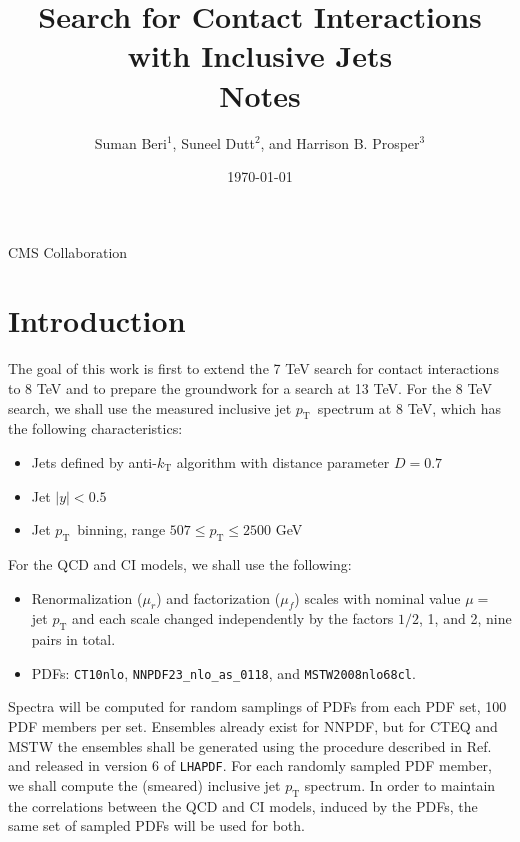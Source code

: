 \documentclass[aps,prd,preprint,nofootinbib]{revtex4}
\begin{document}
\newcommand{\pT}{\textrm{$p_\textrm{T}$}}
\newcommand{\pTprime}{\textrm{$p_\textrm{T}^\prime$}}


\title{Search for Contact Interactions with Inclusive Jets\\Notes}

\author{Suman Beri$^1$, Suneel Dutt$^2$, and Harrison B. Prosper$^3$}



\date{\today}

\maketitle

\centerline{\large{CMS Collaboration}}

\section{Introduction}
The goal of this work is first to extend the 7 TeV search for contact interactions~\cite{bib:7TeVCI} to 8 TeV and
to prepare the groundwork for a search at 13 TeV.
For the 8 TeV search, we shall use the measured inclusive jet \pT\  spectrum at 8 TeV, which has the following
characteristics: 

\begin{itemize}
\item Jets defined by anti-$k_\text{T}$ algorithm with distance parameter $D = 0.7$
\item Jet $|y| < 0.5$
\item Jet \pT\ binning, range $507 \leq \pT  \leq 2500$ GeV
\end{itemize}
\noindent
For the QCD and CI models, we shall use the following:
\begin{itemize}
\item Renormalization ($\mu_r$) and factorization ($\mu_f$) scales with nominal value $\mu = $ jet $p_\text{T}$ and each scale changed independently by the factors $1/2$, 1, and 2, nine 
pairs in total.

\item PDFs: {\tt CT10nlo}, {\tt NNPDF23\_nlo\_as\_0118}, and {\tt MSTW2008nlo68cl}. 
\end{itemize}

Spectra will be computed for random samplings of PDFs from each PDF set, 100 PDF members per set.  Ensembles already exist for NNPDF, but for CTEQ and MSTW the ensembles shall be generated using the procedure described in Ref.~\cite{bib:MSTW} and released in version 6 of {\tt LHAPDF}. For each randomly sampled PDF member, we shall compute the (smeared) inclusive jet $p_\textrm{T}$ spectrum.
In order to maintain the correlations between the QCD and CI models, induced by the PDFs, the same set of sampled PDFs will be used for both. 
\end{document}
